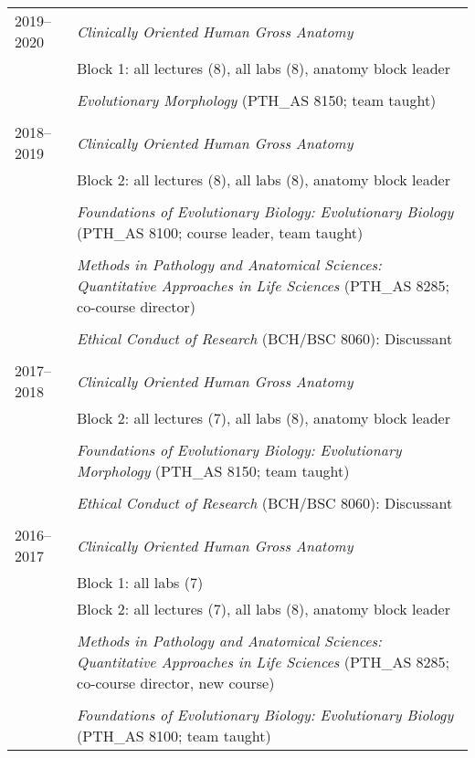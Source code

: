 \begin{longtable}{@{}lX@{}}
  2019--2020 & \textit{Clinically Oriented Human Gross Anatomy}\\
  & Block 1: all lectures (8), all labs (8), anatomy block leader\\
  \\
  & \textit{Evolutionary Morphology} (PTH\_AS 8150; team taught)\\
  \\
  2018--2019 & \textit{Clinically Oriented Human Gross Anatomy}\\
  & Block 2: all lectures (8), all labs (8), anatomy block leader\\
  \\
  & \textit{Foundations of Evolutionary Biology: Evolutionary Biology} (PTH\_AS 8100; course leader, team taught)\\
  \\
  & \textit{Methods in Pathology and Anatomical Sciences: Quantitative Approaches in Life Sciences} (PTH\_AS 8285; co-course director)\\
  \\
  & \textit{Ethical Conduct of Research} (BCH/BSC 8060): Discussant\\
  \\
  2017--2018 & \textit{Clinically Oriented Human Gross Anatomy}\\
  & Block 2: all lectures (7), all labs (8), anatomy block leader\\
  \\
  & \textit{Foundations of Evolutionary Biology: Evolutionary Morphology} (PTH\_AS 8150; team taught)\\
  \\
  & \textit{Ethical Conduct of Research} (BCH/BSC 8060): Discussant\\
  \\
    2016--2017 & \textit{Clinically Oriented Human Gross Anatomy}\\
    & Block 1: all labs (7)\\
    & Block 2: all lectures (7), all labs (8), anatomy block leader\\
    \\
    & \textit{Methods in Pathology and Anatomical Sciences: Quantitative Approaches in Life Sciences} (PTH\_AS 8285; co-course director, new course)\\
    \\
    & \textit{Foundations of Evolutionary Biology: Evolutionary Biology} (PTH\_AS 8100; team taught)\\

\end{longtable}
